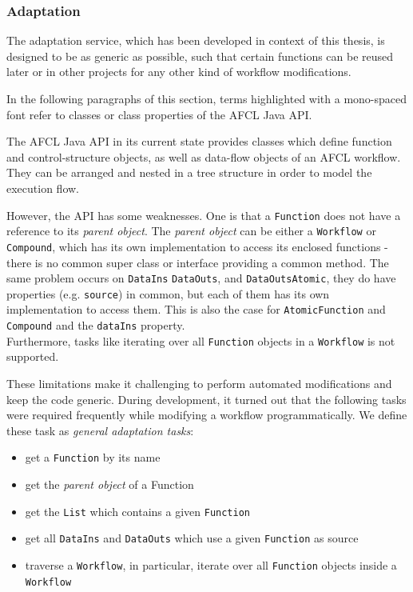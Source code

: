 \documentclass[a4paper,12pt,pdftex,halfparskip,cleardoubleempty,bibtotoc,liststotoc]{scrbook}
\begin{document}
\subsubsection{Adaptation}
The adaptation service, which has been developed in context of this thesis, is designed to be as generic as possible, such that certain functions can be reused later or in other projects for any other kind of workflow modifications.

In the following paragraphs of this section, terms highlighted with a mono-spaced font refer to classes or class properties of the AFCL Java API.

The AFCL Java API in its current state provides classes which define function and control-structure objects, as well as data-flow objects of an AFCL workflow. They can be arranged and nested in a tree structure in order to model the execution flow.

However, the API has some weaknesses. One is that a \texttt{Function} does not have a reference to its \textit{parent object}. The \textit{parent object} can be either a \texttt{Workflow} or \texttt{Compound}, which has its own implementation to access its enclosed functions - there is no common super class or interface providing a common method. The same problem occurs on \texttt{DataIns} \texttt{DataOuts}, and \texttt{DataOutsAtomic}, they do have properties (e.g. \texttt{source}) in common, but each of them has its own implementation to access them. This is also the case for \texttt{AtomicFunction} and \texttt{Compound} and the \texttt{dataIns} property.\\
Furthermore, tasks like iterating over all \texttt{Function} objects in a \texttt{Workflow} is not supported. 

These limitations make it challenging to perform automated modifications and keep the code generic.
During development, it turned out that the following tasks were required frequently while modifying a workflow programmatically. We define these task  as \textit{general adaptation tasks}:
\begin{itemize}
	\item get a \texttt{Function} by its name
	\item get the \textit{parent object} of a Function
	\item get the \texttt{List} which contains a given \texttt{Function}
	\item get all \texttt{DataIns} and \texttt{DataOuts} which use a given \texttt{Function} as source
	\item traverse a \texttt{Workflow}, in particular, iterate over all \texttt{Function} objects inside a \texttt{Workflow}
\end{itemize}
\end{document}
